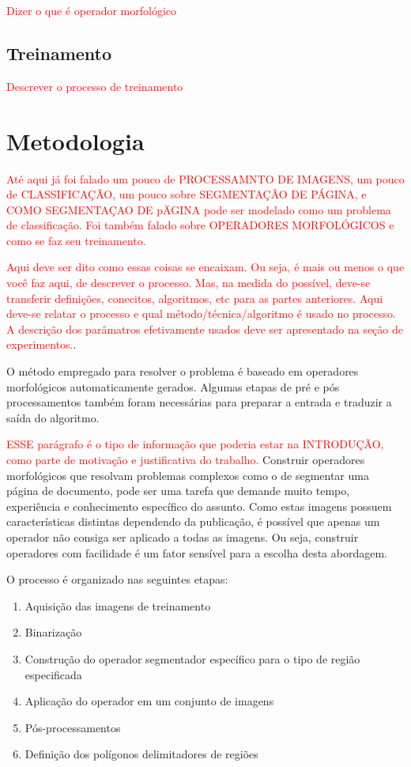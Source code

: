 \documentclass[a4paper,11pt]{article}
\newcommand{\TODO}[1]{\textcolor{red}{#1}}
\begin{document}
\TODO{Dizer o que é operador morfológico}


\subsection{Treinamento}

\TODO{Descrever o processo de treinamento}







\section{Metodologia}

\TODO{Até aqui já foi falado um pouco de PROCESSAMNTO DE IMAGENS, um
  pouco de CLASSIFICAÇÃO, um pouco sobre SEGMENTAÇÃO DE PÁGINA, e COMO
  SEGMENTAÇAO DE pÄGINA pode ser modelado como um problema de
  classificação. Foi também falado sobre OPERADORES MORFOLÓGICOS e
  como se faz seu treinamento.}

\TODO{Aqui deve ser dito como essas coisas se encaixam. Ou seja, é
  mais ou menos o que você faz aqui, de descrever o processo. Mas, na
  medida do possível, deve-se transferir definições, conecitos,
  algoritmos, etc para as partes anteriores. Aqui deve-se relatar o
  processo e qual método/técnica/algoritmo é usado no processo. A
  descrição dos parâmatros efetivamente usados deve ser apresentado na
seção de experimentos.}.

O método empregado para resolver o problema é baseado em operadores morfológicos automaticamente gerados. Algumas etapas de pré e pós processamentos também foram necessárias para preparar a entrada e traduzir a saída do algoritmo.


\TODO{ESSE parágrafo é o tipo de informação que poderia estar na
  INTRODUÇÃO, como parte de motivação e justificativa do trabalho.}
Construir operadores morfológicos que resolvam problemas complexos como o de segmentar uma página de documento, pode ser uma tarefa que demande muito tempo, experiência e conhecimento específico do assunto. Como estas imagens possuem características distintas dependendo da publicação, é possível que apenas um operador não consiga ser aplicado a todas as imagens. Ou seja, construir operadores com facilidade é um fator sensível para a escolha desta abordagem.


    O processo é organizado nas seguintes etapas:

    \begin{enumerate}
      \item Aquisição das imagens de treinamento
      \item Binarização
      \item Construção do operador segmentador específico para o tipo de região especificada
      \item Aplicação do operador em um conjunto de imagens
      \item Pós-processamentos
      \item Definição dos polígonos delimitadores de regiões
    \end{enumerate}
\end{document}
